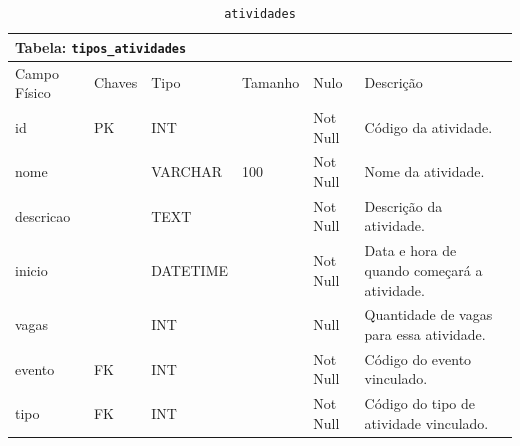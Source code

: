 \documentclass[12pt,a4paper]{article}
\begin{document}
\begin{center}
\begin{table}[h!]
	\caption{\texttt{atividades}}
	\label{tabela:atividades}
	\begin{tabular}{|p{2.5cm}|p{1cm}|p{1.25cm}|p{1.75cm}|p{1.25cm}|p{5cm}|}\hline	
		\multicolumn{6}{|p{16cm}|}{\cellcolor{cinzaClaro}  \centering Tabela: \texttt{tipos\_atividades}} \\ \hline %
		{\small Campo Físico}   & {\small Chaves} & {\small Tipo} & {\small Tamanho} & {\small Nulo} & {\small Descrição}\\\hline %
		
		{\tiny id}  & {\tiny PK} & {\tiny INT} & {\tiny } & {\tiny Not Null} &{\tiny Código da atividade.}\\\hline
		{\tiny nome}  & {\tiny } & {\tiny VARCHAR} & {\tiny 100} & {\tiny Not Null} &{\tiny Nome da atividade.}\\\hline
		{\tiny descricao}  & {\tiny } & {\tiny TEXT} & {\tiny } & {\tiny Not Null} &{\tiny Descrição da atividade.}\\\hline
		{\tiny inicio}  & {\tiny } & {\tiny DATETIME} & {\tiny } & {\tiny Not Null} &{\tiny Data e hora de quando começará a atividade.}\\\hline
		{\tiny vagas}  & {\tiny } & {\tiny INT} & {\tiny } & {\tiny Null} &{\tiny Quantidade de vagas para essa atividade.}\\\hline
		{\tiny evento}  & {\tiny FK} & {\tiny INT} & {\tiny } & {\tiny Not Null} &{\tiny Código do evento vinculado.}\\\hline
		{\tiny tipo}  & {\tiny FK} & {\tiny INT} & {\tiny } & {\tiny Not Null} &{\tiny Código do tipo de atividade vinculado.}\\\hline
		
			
	\end{tabular}
\end{table}	
\end{center}
\end{document}
